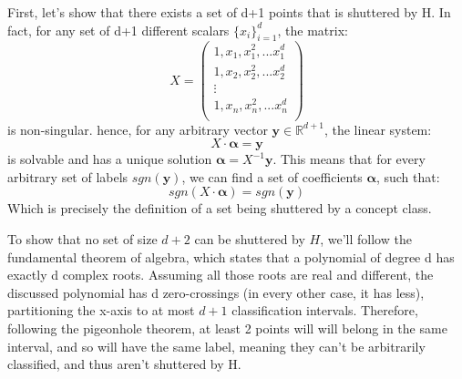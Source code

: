 First, let's show that there exists a set of d+1 points that is shuttered by H. 
In fact, for any set of d+1 different scalars $\{x_i\}_{i=1}^d$, the matrix:
\begin{equation*}
    X = \begin{pmatrix}
        1, x_1, x_1^2, ... x_1^d \\
        1, x_2, x_2^2, ... x_2^d \\
        \vdots \\
        1, x_n, x_n^2, ... x_n^d \\
    \end{pmatrix}
\end{equation*}
is non-singular. hence, for any arbitrary vector $\boldsymbol{y} \in \mathbb{R}^{d+1}$, the linear system:
\begin{equation*}
    X \cdot \boldsymbol{\alpha} = \boldsymbol{y}
\end{equation*}
is solvable and has a unique solution $\boldsymbol{\alpha} = X^{-1}\boldsymbol{y}$. This means that for every arbitrary set of labels $sgn(\boldsymbol{y})$, we can find a set of coefficients $\boldsymbol{\alpha}$, such that:
\begin{equation*}
    sgn(X \cdot \boldsymbol{\alpha}) = sgn(\boldsymbol{y})
\end{equation*}
Which is precisely the definition of a set being shuttered by a concept class.

To show that no set of size $d+2$ can be shuttered by $H$, we'll follow the fundamental theorem of algebra, which states that a polynomial of degree d has exactly d complex roots. Assuming all those roots are real and different, the discussed polynomial has d zero-crossings (in every other case, it has less), partitioning the x-axis to at most $d+1$ classification intervals. Therefore, following the pigeonhole theorem, at least 2 points will will belong in the same interval, and so will have the same label, meaning they can't be arbitrarily classified, and thus aren't shuttered by H.
